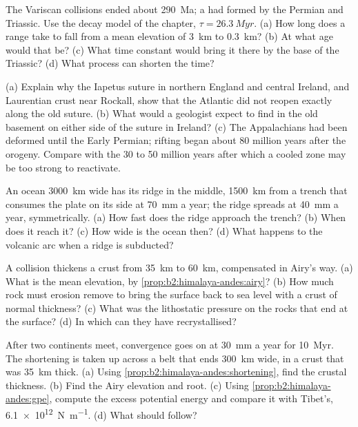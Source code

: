 \begin{exercise}[$\star\star$]\label{exo:b2:wilson-cycle:8}
The Variscan collisions ended about \qty{290}{Ma}; a  had formed by the Permian and
Triassic. Use the decay model of the chapter, $\tau = \qty{26.3}{Myr}$. (a) How long does a
range take to fall from a mean elevation of \qty{3}{km} to \qty{0.3}{km}? (b) At what age would
that be? (c) What time constant would bring it there by the base of the Triassic? (d) What
process can shorten the time?
\end{exercise}

\begin{exercise}[$\star\star$]\label{exo:b2:wilson-cycle:9}
(a) Explain why the Iapetus suture in northern England and central Ireland, and Laurentian
crust near Rockall, show that the Atlantic did not reopen exactly along the old suture.
(b) What would a geologist expect to find in the old basement on either side of the suture
in Ireland? (c) The Appalachians had been deformed until the Early Permian; rifting began
about 80 million years after the orogeny. Compare with the 30 to 50 million years after which
a cooled zone may be too strong to reactivate.
\end{exercise}

\begin{exercise}[$\star\star\star$]\label{exo:b2:wilson-cycle:10}
An ocean \qty{3000}{km} wide has its ridge in the middle, \qty{1500}{km} from a trench that
consumes the plate on its side at \qty{70}{mm} a year; the ridge spreads at \qty{40}{mm} a
year, symmetrically. (a) How fast does the ridge approach the trench? (b) When does it reach
it? (c) How wide is the ocean then? (d) What happens to the volcanic arc when a ridge is
subducted?
\end{exercise}

\begin{exercise}[$\star\star\star$]\label{exo:b2:wilson-cycle:11}
A collision thickens a crust from \qty{35}{km} to \qty{60}{km}, compensated in Airy's way.
(a) What is the mean elevation, by \cref{prop:b2:himalaya-andes:airy}? (b) How much rock must
erosion remove to bring the surface back to sea level with a crust of normal thickness?
(c) What was the lithostatic pressure on the rocks that end at the surface? (d) In which
 can they have recrystallised?
\end{exercise}

\begin{exercise}[$\star\star\star$]\label{exo:b2:wilson-cycle:12}
After two continents meet, convergence goes on at \qty{30}{mm} a year for \qty{10}{Myr}. The
shortening is taken up across a belt that ends \qty{300}{km} wide, in a crust that was
\qty{35}{km} thick. (a) Using \cref{prop:b2:himalaya-andes:shortening}, find the crustal
thickness. (b) Find the Airy elevation and root. (c) Using \cref{prop:b2:himalaya-andes:gpe},
compute the excess potential energy and compare it with Tibet's, \qty{6.1e12}{N.m^{-1}}.
(d) What should follow?
\end{exercise}

